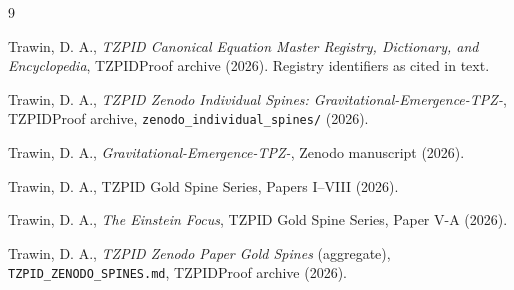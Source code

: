 \documentclass[11pt]{article}
\theoremstyle{remark}
\begin{document}
\begin{thebibliography}{9}

 Trawin, D. A., \emph{TZPID Canonical Equation Master Registry, Dictionary, and Encyclopedia}, TZPIDProof archive (2026). Registry identifiers as cited in text.

 Trawin, D. A., \emph{TZPID Zenodo Individual Spines: Gravitational-Emergence-TPZ-}, TZPIDProof archive, \texttt{zenodo\_individual\_spines/} (2026).

 Trawin, D. A., \emph{Gravitational-Emergence-TPZ-}, Zenodo manuscript (2026).

 Trawin, D. A., TZPID Gold Spine Series, Papers I--VIII (2026).

 Trawin, D. A., \emph{The Einstein Focus}, TZPID Gold Spine Series, Paper V-A (2026).

 Trawin, D. A., \emph{TZPID Zenodo Paper Gold Spines} (aggregate), \texttt{TZPID\_ZENODO\_SPINES.md}, TZPIDProof archive (2026).

\end{thebibliography}
\end{document}
